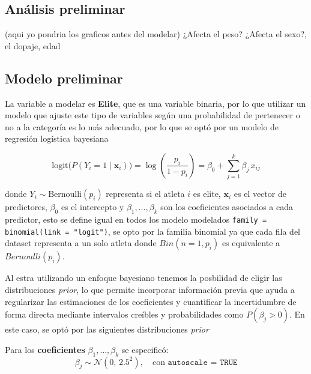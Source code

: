 \documentclass[letter]{article}
\begin{document}
\newpage

\subsection* {Análisis preliminar} (aqui yo pondria los graficos antes del modelar) 
¿Afecta el peso?
¿Afecta el sexo?, el dopaje, edad  



\subsection*{Modelo preliminar}

La variable a modelar es \textbf{Elite}, que es una variable binaria, por lo que utilizar un modelo que ajuste este tipo de variables según 
una probabilidad de pertenecer o no a la categoría es lo más adecuado, por lo que se optó por un modelo de regresión logística bayesiana 

\begin{equation}
    \text{logit}\big(P(Y_i = 1 \mid \mathbf{x}_i)\big) 
    = \log\left(\frac{p_i}{1 - p_i}\right) 
    = \beta_0 + \sum_{j=1}^{k} \beta_j \, x_{ij}
    \label{eq:logit}
\end{equation}

donde $Y_i \sim \text{Bernoulli}(p_i)$ representa si el atleta $i$ es elite, $\mathbf{x}_i$ es el vector de predictores, $\beta_0$ es el 
intercepto y $\beta_1, \dots, \beta_k$ son los coeficientes asociados a cada predictor, esto se define igual en todos los modelo modelados 
\texttt{family = binomial(link = "logit")}, se opto por la familia binomial ya que cada fila del dataset representa a un solo atleta donde 
$Bin(n=1, p_i)$ es equivalente a $Bernoulli(p_i)$. 


Al estra utilizando un enfoque bayesiano tenemos la posbilidad de eligir las distribuciones \textit{prior}, lo que permite incorporar información 
previa que ayuda a regularizar las estimaciones de los coeficientes y cuantificar la incertidumbre de forma directa mediante intervalos creíbles 
y probabilidades como $P(\beta_j > 0)$. En este caso, se optó por las siguientes distribuciones \textit{prior} 

Para los \textbf{coeficientes} $\beta_1, \dots, \beta_k$ se especificó:
\begin{equation}
    \beta_j \sim \mathcal{N}(0, \, 2{.}5^2), \quad \text{con } \texttt{autoscale = TRUE}
    \label{eq:prior_coef}
\end{equation}
\end{document}
